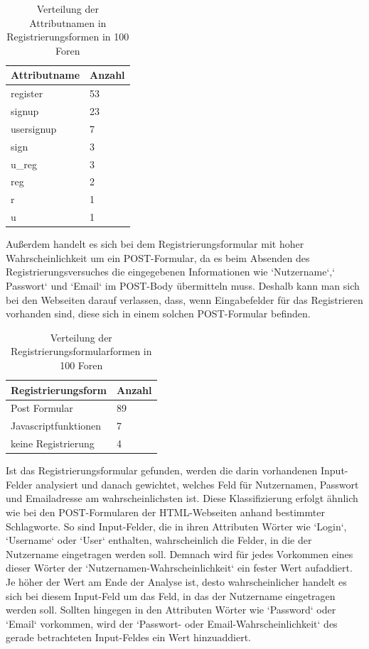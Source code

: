 \begin{table}[h!]
\centering 
\begin{tabular}{ | p{3cm} | p{3cm}|} \hline
\textbf{Attributname} & \textbf{Anzahl} \\ \hline
register & 53 \\ \hline
signup & 23 \\ \hline
usersignup & 7 \\ \hline
sign & 3 \\ \hline
u\_reg & 3 \\ \hline
reg & 2 \\ \hline
r & 1 \\ \hline
u & 1 \\ \hline
\end{tabular}
\caption{Verteilung der Attributnamen in Registrierungsformen in 100 Foren}
\end{table}



Außerdem handelt es sich bei dem Registrierungsformular mit hoher Wahrscheinlichkeit um ein POST-Formular, da es beim Absenden des Registrierungsversuches die eingegebenen Informationen wie `Nutzername`,` Passwort` und `Email` im POST-Body übermitteln muss.
Deshalb kann man sich bei den Webseiten darauf verlassen, dass, wenn Eingabefelder für das Registrieren vorhanden sind, diese sich in einem solchen POST-Formular befinden.

\begin{table}[h!]
\centering 
\begin{tabular}{ | p{5cm} | p{3cm}|} \hline
\textbf{Registrierungsform} & \textbf{Anzahl} \\ \hline
Post Formular & 89 \\ \hline
Javascriptfunktionen & 7 \\ \hline
keine Registrierung & 4 \\ \hline
\end{tabular}
\caption{Verteilung der Registrierungsformularformen in 100 Foren}
\end{table}


Ist das Registrierungsformular gefunden, werden die darin vorhandenen Input-Felder analysiert und danach gewichtet, welches Feld für Nutzernamen, Passwort und Emailadresse am wahrscheinlichsten ist.
Diese Klassifizierung erfolgt ähnlich wie bei den POST-Formularen der HTML-Webseiten anhand bestimmter Schlagworte.
So sind Input-Felder, die in ihren Attributen Wörter wie `Login`, `Username` oder `User` enthalten, wahrscheinlich die Felder, in die der Nutzername eingetragen werden soll. Demnach wird für jedes Vorkommen eines dieser Wörter der `Nutzernamen-Wahrscheinlichkeit` ein fester Wert aufaddiert. Je höher der Wert am Ende der Analyse ist, desto wahrscheinlicher handelt es sich bei diesem Input-Feld um das Feld, in das der Nutzername eingetragen werden soll. Sollten hingegen in den Attributen Wörter wie `Password` oder `Email` vorkommen, wird der `Passwort- oder Email-Wahrscheinlichkeit` des gerade betrachteten Input-Feldes ein Wert hinzuaddiert.

